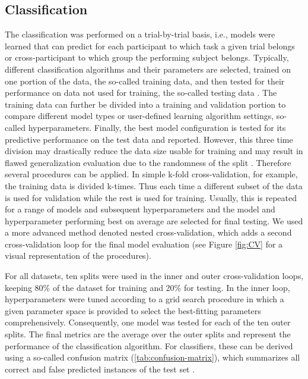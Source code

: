 \subsection{Classification}
The classification was performed on a trial-by-trial basis, i.e., models were learned that can predict for each participant to which task a given trial belongs or cross-participant to which group the performing subject belongs. Typically, different classification algorithms and their parameters are selected, trained on one portion of the data, the so-called training data, and then tested for their performance on data not used for training, the so-called testing data \cite{Daumé2017}. The training data can further be divided into a training and validation portion to compare different model types or user-defined learning algorithm settings, so-called hyperparameters. Finally, the best model configuration is tested for its predictive performance on the test data and reported. However, this three time division may drastically reduce the data size usable for training and may result in flawed generalization evaluation due to the randomness of the split \cite{VAROQUAUX2017166}. Therefore several procedures can be applied. In simple k-fold cross-validation, for example, the training data is divided k-times. Thus each time a different subset of the data is used for validation while the rest is used for training. Usually, this is repeated for a range of models and subsequent hyperparameters and the model and hyperparameter performing best on average are selected for final testing. We used a more advanced method denoted nested cross-validation, which adds a second cross-validation loop for the final model evaluation (see Figure \ref{fig:CV} for a visual representation of the procedures).

\begin{figure*}[h]
\centering
   
  \caption[Nested cross-validation procedure]{Nested cross-validation procedure. CV: cross-validation, Val: Validation}
  \label{fig:CV}
\end{figure*}

\noindent For all datasets, ten splits were used in the inner and outer cross-validation loops, keeping 80\% of the dataset for training and 20\% for testing. In the inner loop, hyperparameters were tuned according to a grid search procedure in which a given parameter space is provided to select the best-fitting parameters \cite{VAROQUAUX2017166} comprehensively. Consequently, one model was tested for each of the ten outer splits. The final metrics are the average over the outer splits and represent the performance of the classification algorithm. For classifiers, these can be derived using a so-called confusion matrix (\autoref{tab:confusion-matrix}), which summarizes all correct and false predicted instances of the test set \cite{Fawcett2006}.  

